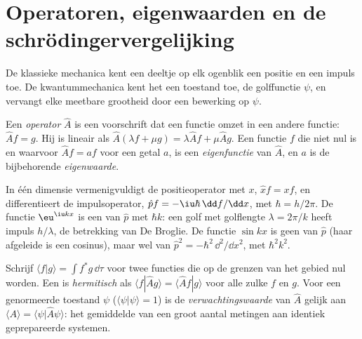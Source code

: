 \section{Operatoren, eigenwaarden en de schrödingervergelijking}

De klassieke mechanica kent een deeltje op elk ogenblik een positie en een
impuls toe. De kwantummechanica kent het een toestand toe, de golffunctie
$\psi$, en vervangt elke meetbare grootheid door een bewerking op $\psi$.

\begin{definition}\label{def:b3:quantum-model-systems:operator}
Een \emph{operator} $\hat A$ is een voorschrift dat een
functie omzet in een andere functie: $\hat A f = g$. Hij is lineair als $\hat A(\lambda f +
\mu g) = \lambda\hat Af + \mu\hat Ag$. Een functie $f$ die niet nul is en
waarvoor $\hat Af = a f$ voor een getal $a$, is een
\emph{eigenfunctie} van $\hat A$, en $a$ is de
bijbehorende \emph{eigenwaarde}.
\end{definition}

\begin{example}\label{ex:b3:quantum-model-systems:xp}
In één dimensie vermenigvuldigt de positieoperator met $x$, $\hat x f = xf$,
en differentieert de impulsoperator, $\hat p f = -\iu\hbar\,
\dd f/\dd x$, met $\hbar = h/2\pi$. De functie $\eu^{\iu kx}$ is een
 van $\hat p$ met  $\hbar k$: een golf met golflengte
$\lambda = 2\pi/k$ heeft impuls $h/\lambda$, de betrekking van De Broglie.
De functie $\sin kx$ is geen  van $\hat p$ (haar afgeleide is
een cosinus), maar wel van $\hat p^2 = -\hbar^2\,\dd^2/\dd x^2$, met
 $\hbar^2k^2$.
\end{example}

\begin{definition}\label{def:b3:quantum-model-systems:hermitian}
Schrijf $\langle f|g\rangle = \int f^*g\,\dd\tau$ voor twee functies die op
de grenzen van het gebied nul worden. Een  is
\emph{hermitisch}
als $\langle f|\hat Ag\rangle = \langle \hat Af|g\rangle$ voor alle zulke
$f$ en $g$. Voor een genormeerde toestand $\psi$ ($\langle\psi|\psi\rangle = 1$) is de
\emph{verwachtingswaarde} van $\hat A$ gelijk aan
$\langle A\rangle = \langle\psi|\hat A\psi\rangle$: het gemiddelde van een
groot aantal metingen aan identiek geprepareerde systemen.
\end{definition}

